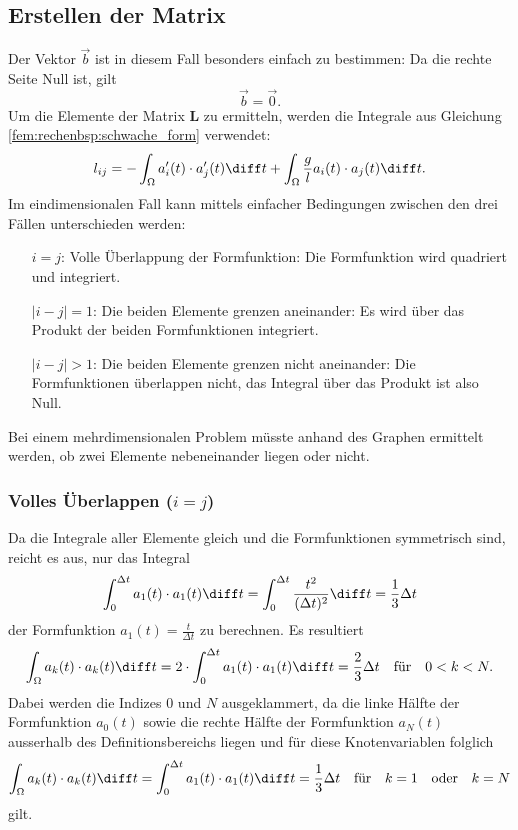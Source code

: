 \subsection{Erstellen der Matrix}
Der Vektor $\vec{b}$ ist in diesem Fall besonders einfach zu bestimmen: Da die rechte Seite Null ist, gilt
\begin{equation}
    \vec{b} = \vec{0}.
\end{equation}
Um die Elemente der Matrix $\mathbf{L}$ zu ermitteln, werden die Integrale aus Gleichung \eqref{fem:rechenbsp:schwache_form} verwendet:
\begin{equation}
    l_{ij} = - \int_\Omega a_i'(t) \cdot a_j'(t) \diff t + \int_\Omega \frac{g}{l} a_i(t) \cdot a_j(t) \diff t.
\end{equation}
Im eindimensionalen Fall kann mittels einfacher Bedingungen zwischen den drei Fällen unterschieden werden:
\begin{itemize}
    \item[$i = j$:] Volle Überlappung der Formfunktion: Die Formfunktion wird quadriert und integriert. 
    \item[$|i - j| = 1$:] Die beiden Elemente grenzen aneinander: Es wird über das Produkt der beiden Formfunktionen integriert.
    \item[$|i - j| > 1$:] Die beiden Elemente grenzen nicht aneinander: Die Formfunktionen überlappen nicht, das Integral über das Produkt ist also Null.
\end{itemize}
Bei einem mehrdimensionalen Problem müsste anhand des Graphen ermittelt werden, ob zwei Elemente nebeneinander liegen oder nicht.

\subsubsection{Volles Überlappen ($i = j$)}
Da die Integrale aller Elemente gleich und die Formfunktionen symmetrisch sind, reicht es aus, nur das Integral
\begin{equation}
    \int_{0}^{\Delta t} a_1(t) \cdot a_1(t) \diff t
    = \int_{0}^{\Delta t} \frac{t^2}{(\Delta t)^2} \diff t 
    = \frac{1}{3} \Delta t
\end{equation}
der Formfunktion $ a_1(t) = \frac{t}{\Delta t} $ zu berechnen.
Es resultiert
\begin{equation}
    \int_\Omega a_k(t) \cdot a_k(t) \diff t 
    = 2 \cdot \int_{0}^{\Delta t} a_1(t) \cdot a_1(t) \diff t 
    = \frac{2}{3} \Delta t 
    \quad \text{für} \quad 0 < k < N.
\end{equation}
Dabei werden die Indizes $0$ und $N$ ausgeklammert, da die linke Hälfte der Formfunktion $a_0(t)$ sowie die rechte Hälfte der Formfunktion $a_N(t)$ ausserhalb des Definitionsbereichs liegen und für diese Knotenvariablen folglich
\begin{equation}
    \int_\Omega a_k(t) \cdot a_k(t) \diff t 
    = \int_{0}^{\Delta t} a_1(t) \cdot a_1(t) \diff t 
    = \frac{1}{3} \Delta t 
    \quad \text{für} \quad k = 1 \quad \text{oder} \quad k = N
\end{equation}
gilt.

